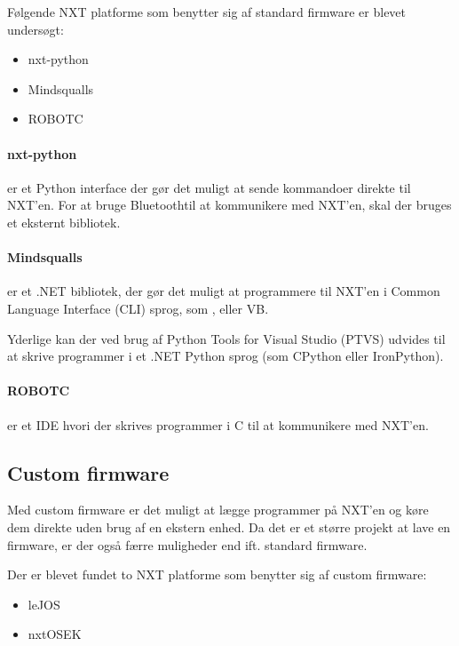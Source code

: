 Følgende NXT platforme som benytter sig af standard firmware er blevet undersøgt:
\begin{itemize}
\item{nxt-python}
\item{Mindsqualls}
\item{ROBOTC}
\end{itemize}

\paragraph{nxt-python} er et Python interface der gør det muligt at sende kommandoer direkte til NXT'en.
For at bruge Bluetooth\textregistered til at kommunikere med NXT'en, skal der bruges et eksternt bibliotek. \cite{nxt-python}

\paragraph{Mindsqualls} er et .NET bibliotek, der gør det muligt at programmere til NXT'en i Common Language Interface (CLI) sprog, som \csharp, \fsharp eller VB. \cite{mindsqualls}

Yderlige kan der ved brug af Python Tools for Visual Studio (PTVS) udvides til at skrive programmer i et .NET Python sprog (som CPython eller IronPython). \cite{ptvs}

\paragraph{ROBOTC} er et IDE hvori der skrives programmer i C til at kommunikere med NXT'en. \cite{robotc}

\subsection{Custom firmware}
Med custom firmware er det muligt at lægge programmer på NXT'en og køre dem direkte uden brug af en ekstern enhed.
Da det er et større projekt at lave en firmware, er der også færre muligheder end ift. standard firmware. 

Der er blevet fundet to NXT platforme som benytter sig af custom firmware:
\begin{itemize}
\item{leJOS}
\item{nxtOSEK}
\end{itemize}

